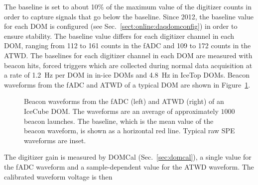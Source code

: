 The baseline is set to about 10\% of the maximum value of the
digitizer counts in
order to capture signals that go below the baseline. Since 2012, the
baseline value for each DOM is configured (see Sec.~\ref{sect:online:daqdomconfig}) in order to ensure 
stability. The baseline value differs for each digitizer channel in
each DOM, ranging from 112 to 161 counts in the fADC and 109 to 172
counts in the ATWD. The baselines for each digitizer channel in each DOM are measured with
beacon hits, forced triggers which are collected during normal data
acquisition at a rate of 1.2~Hz per DOM
in in-ice DOMs and 4.8~Hz in IceTop DOMs. Beacon waveforms
from the fADC and ATWD of a typical DOM are shown in Figure~\ref{fig:raw_baselines}.

\begin{figure}[!h]
  \captionsetup[subfigure]{labelformat=empty}
  \centering
  \caption{Beacon waveforms from the fADC (left) and ATWD (right) of
    an IceCube DOM. The waveforms are an average of approximately $1000$ beacon
   launches. The baseline, which is the mean value of the
    beacon waveform, is shown as a horizontal red line. Typical raw SPE
    waveforms are inset.}
  \label{fig:raw_baselines}
\end{figure}

The digitizer gain is measured by DOMCal (Sec.~\ref{sec:domcal}), a single
value for the fADC waveform and a sample-dependent value for the ATWD
waveform. The calibrated waveform voltage is then

